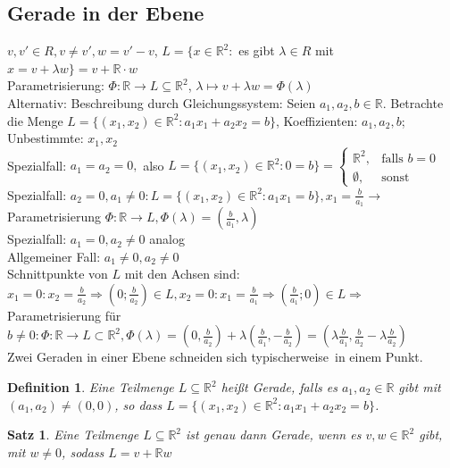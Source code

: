 \documentclass[12pt,a4paper]{article}
\theoremstyle{plain}
\newtheorem{Satz}[Theorem]{Satz}
\newtheorem{Definition}[Theorem]{Definition}
\newcommand{\R}{\mathbb{R}}
\numberwithin{equation}{section}
\begin{document}
\subsection{Gerade in der Ebene}
$v,v'\in R, v\neq v', w=v'-v$, $L=\{x\in \R^2:$ es gibt $\lambda\in R$ mit $x=v+\lambda w\}=v+\R\cdot w$\\
Parametrisierung: $\Phi:\R \rightarrow L\subseteq \R^2$, $\lambda \mapsto v+\lambda w=\Phi(\lambda)$\\
Alternativ: Beschreibung durch Gleichungssystem: Seien $a_1, a_2, b\in \R$. Betrachte die Menge $L=\{(x_1,x_2)\in\R^2:a_1 x_1+a_2 x_2=b\}$, Koeffizienten: $a_1, a_2, b$; Unbestimmte: $x_1, x_2$\\
Spezialfall: $a_1=a_2=0,$ also $L=\{(x_1,x_2)\in\R^2:0=b\}=\left\lbrace \begin{array}{ll} \R^2,&\text{falls }b=0\\ \emptyset,&\text{sonst}
\end{array}\right.$\\
Spezialfall: $a_2=0,a_1\neq 0: L=\{(x_1,x_2)\in\R^2:a_1 x_1=b\}, x_1=\frac{b}{a_1} \rightarrow$ Parametrisierung $\Phi: \R \rightarrow L, \Phi(\lambda)=\left(\frac{b}{a_1},\lambda\right)$\\
Spezialfall: $a_1=0,a_2\neq 0$ analog\\
\glqq Allgemeiner Fall\grqq: $a_1\neq 0, a_2\neq 0$\\
Schnittpunkte von $L$ mit den Achsen sind: $x_1=0:x_2=\frac{b}{a_2} \Rightarrow \left(0;\frac{b}{a_2}\right)\in L, x_2=0: x_1=\frac{b}{a_1} \Rightarrow \left(\frac{b}{a_1};0\right)\in L \Rightarrow$ Parametrisierung für $b\neq 0: \Phi: \R \rightarrow L \subset \R^2, \Phi(\lambda)=\left(0,\frac{b}{a_2}\right)+\lambda\left(\frac{b}{a_1},-\frac{b}{a_2} \right)= \left(\lambda\frac{b}{a_1},\frac{b}{a_2}-\lambda\frac{b}{a_2}\right)$\\
Zwei Geraden in einer Ebene schneiden sich \glqq typischerweise\grqq\ in einem Punkt.
\begin{Definition}
Eine Teilmenge $L\subseteq \R^2$ heißt Gerade, falls es $a_1,a_2\in \R$ gibt mit $(a_1,a_2)\neq(0,0)$, so dass $L=\{(x_1,x_2)\in\R^2:a_1 x_1+ a_2 x_2=b\}$.
\end{Definition}
\begin{Satz}
Eine Teilmenge $L\subseteq\R^2$ ist genau dann Gerade, wenn es $v,w\in\R^2$ gibt, mit $w\neq 0$, sodass $L=v+\R w$
\end{Satz}
\end{document}
